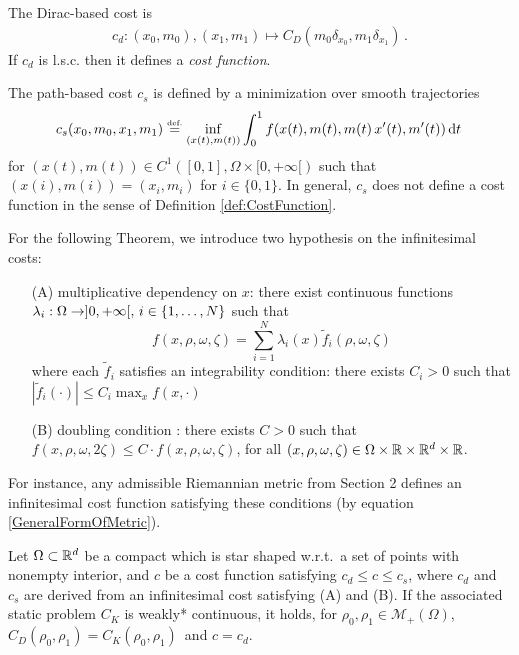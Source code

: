 \begin{definition}
The Dirac-based cost is
\begin{align}
	\label{eq:c between Diracs}
	c_d : (x_0, m_0) , (x_1, m_1) \mapsto C_D(m_0 \delta_{x_0}, m_1 \delta_{x_1}) \, .
\end{align}
If $c_d$ is l.s.c. then it defines a \emph{cost function}. 
\end{definition}
\begin{definition}
The path-based cost $c_s$ is defined by a minimization over smooth trajectories
\begin{equation}\label{eq-pathspace}
c_s(x_0,m_0,x_1,m_1) \stackrel{\mbox{\upshape\tiny def.}}{=} \inf_{ (x(t),m(t))}  \int_0^1 f(x(t),m(t),m(t)\, x'(t),m'(t)) \, \mathrm{d} t\,
\end{equation}
for $(x(t),m(t)) \in C^1([0,1],\Omega \times [0,+\infty[)$ such that $(x(i),m(i)) = (x_i,m_i)$ for $i\in \{ 0,1\}$. In general, $c_s$ does not define a cost function in the sense of Definition \ref{def:CostFunction}.
\end{definition}

For the following Theorem, we introduce two hypothesis on the infinitesimal costs: 
\begin{itemize}
\item[(A)] multiplicative dependency on $x$: there exist continuous functions $\lambda_i : \Omega \to ]0,+\infty[, \, i\in \{1,\dots , N\}$ such that 
\begin{equation}\label{continuity assumption}
f(x,\rho,\omega,\zeta) = \sum_{i=1}^N \lambda_i(x) \tilde{f}_i(\rho,\omega,\zeta)
\end{equation}
 where each $\tilde{f}_i$ satisfies an integrability condition: there exists $C_i>0$ such that $|\tilde{f}_i(\cdot)|\leq C_i \max_x f(x,\cdot)$
%
\item[(B)] doubling condition : there exists $C>0$ such that $f(x,\rho,\omega,2\zeta)\leq C \cdot f(x,\rho,\omega,\zeta)$, for all $(x,\rho,\omega,\zeta) \in \Omega \times \mathbb{R} \times \mathbb{R}^d \times \mathbb{R}$.
 \end{itemize}
For instance, any admissible Riemannian metric from Section 2 defines an infinitesimal cost function satisfying these conditions (by equation \eqref{GeneralFormOfMetric}). 
%
\begin{theorem}
\label{th: continuous static general}
Let $\Omega \subset \mathbb{R}^d$ be a compact which is star shaped w.r.t.\ a set of points with nonempty interior, and $c$ be a cost function satisfying $c_d \leq c \leq c_s$, where $c_d$ and $c_s$ are derived from an infinitesimal cost satisfying (A) and (B). If the associated static problem $C_K$ is weakly* continuous, it holds, for $\rho_0, \rho_1 \in \mathcal{M}_+(\Omega)$, $C_D(\rho_0, \rho_1) = C_K(\rho_0,\rho_1)\,$ and $c = c_d$.
\end{theorem}

